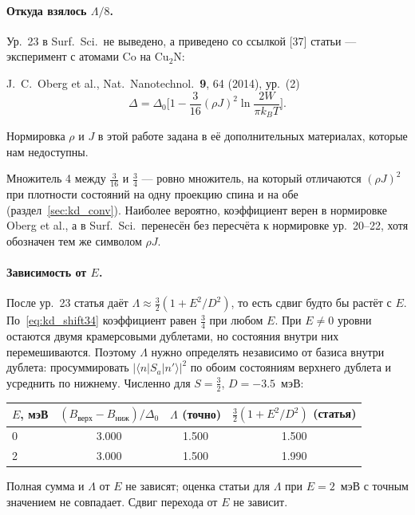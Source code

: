 \paragraph{Откуда взялось $\Lambda/8$.} Ур.~23 в Surf.\ Sci.\ не выведено, а приведено
со ссылкой [37] статьи --- эксперимент с атомами Co на Cu$_2$N:
\begin{paperbox}{J.~C.~Oberg et al., Nat.\ Nanotechnol.\ \textbf{9}, 64 (2014), ур.~(2)}
\[
\Delta=\Delta_0\Big[1-\frac{3}{16}(\rho J)^2\ln\frac{2W}{\pi k_BT}\Big].
\]
\end{paperbox}
Нормировка $\rho$ и $J$ в этой работе задана в её дополнительных материалах,
которые нам недоступны.
\begin{cmpbox}[Вывод по ур.~23]
Множитель 4 между $\tfrac3{16}$ и $\tfrac34$ --- ровно множитель, на который
отличаются $(\rho J)^2$ при плотности состояний на одну проекцию спина и на
обе (раздел~\ref{sec:kd_conv}). Наиболее вероятно, коэффициент верен в
нормировке Oberg et al., а в Surf.\ Sci.\ перенесён без пересчёта к нормировке
ур.~20--22, хотя обозначен тем же символом $\rho J$.
\end{cmpbox}

\paragraph{Зависимость от $E$.} После ур.~23 статья даёт $\Lambda\approx\tfrac32(1+E^2/D^2)$,
то есть сдвиг будто бы растёт с $E$. По~\eqref{eq:kd_shift34} коэффициент равен $\tfrac34$
при любом $E$. При $E\ne0$ уровни остаются двумя крамерсовыми дублетами, но
состояния внутри них перемешиваются. Поэтому $\Lambda$ нужно определять
независимо от базиса внутри дублета: просуммировать $|\langle n|S_a|n'\rangle|^2$ по
обоим состояниям верхнего дублета и усреднить по нижнему. Численно для
$S=\tfrac32$, $D=-3.5$~мэВ:
\begin{center}\small
\begin{tabular}{lccc}
\toprule
$E$, мэВ & $(B_{\text{верх}}-B_{\text{ниж}})/\Delta_0$ & $\Lambda$ (точно) & $\tfrac32(1+E^2/D^2)$ (статья) \\
\midrule
0 & 3.000 & 1.500 & 1.500 \\
2 & 3.000 & 1.500 & 1.990 \\
\bottomrule
\end{tabular}
\end{center}
\begin{cmpbox}
Полная сумма и $\Lambda$ от $E$ не зависят; оценка статьи для $\Lambda$ при $E=2$~мэВ с
точным значением не совпадает. Сдвиг перехода от $E$ не зависит.
\end{cmpbox}


